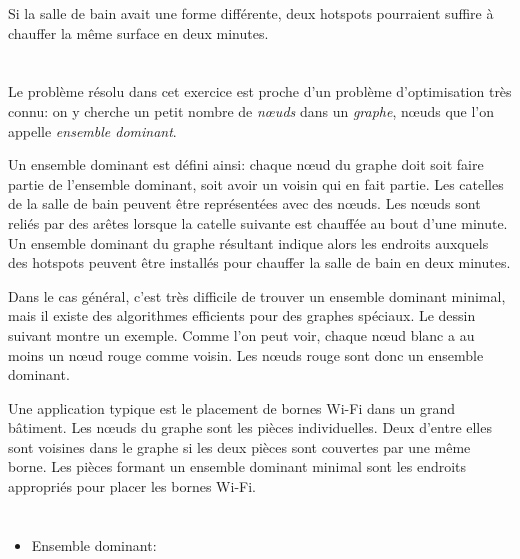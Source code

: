 {{{\centering%
\par}

Si la salle de bain avait une forme différente, deux hotspots pourraient suffire à chauffer la même surface en deux minutes.



\section*{\BrochureItsInformatics}
Le problème résolu dans cet exercice est proche d’un problème d’optimisation très connu: on y cherche un petit nombre de \emph{nœuds} dans un \emph{graphe}, nœuds que l’on appelle \emph{ensemble dominant}.

Un ensemble dominant est défini ainsi: chaque nœud du graphe doit soit faire partie de l’ensemble dominant, soit avoir un voisin qui en fait partie. Les catelles de la salle de bain peuvent être représentées avec des nœuds. Les nœuds sont reliés par des arêtes lorsque la catelle suivante est chauffée au bout d’une minute. Un ensemble dominant du graphe résultant indique alors les endroits auxquels des hotspots peuvent être installés pour chauffer la salle de bain en deux minutes.

Dans le cas général, c’est très difficile de trouver un ensemble dominant minimal, mais il existe des algorithmes efficients pour des graphes spéciaux. Le dessin suivant montre un exemple. Comme l’on peut voir, chaque nœud blanc a au moins un nœud rouge comme voisin. Les nœuds rouge sont donc un ensemble dominant.

{\centering%
\par}

Une application typique est le placement de bornes Wi-Fi dans un grand bâtiment. Les nœuds du graphe sont les pièces individuelles. Deux d’entre elles sont voisines dans le graphe si les deux pièces sont couvertes par une même borne. Les pièces formant un ensemble dominant minimal sont les endroits appropriés pour placer les bornes Wi-Fi.



\section*{\BrochureWebsitesAndKeywords}
{\raggedright
\begin{itemize}
  \item Ensemble dominant: \href{https://fr.wikipedia.org/wiki/Ensemble_dominant}{}
\end{itemize}


}}}
